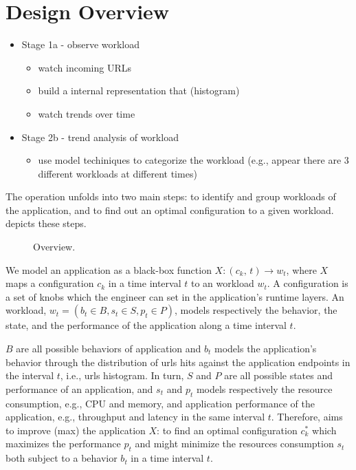 \section{Design Overview}



 \begin{itemize}
   \item Stage 1a - observe workload
     \begin{itemize}
       \item watch incoming URLs
       \item build a internal representation that (histogram)
       \item watch trends over time
     \end{itemize}
   \item Stage 2b - trend analysis of workload
     \begin{itemize}
       \item use model techiniques to categorize the workload (e.g., appear there are 3 different workloads at different
         times)
     \end{itemize}
 \end{itemize}



The \name operation unfolds into two main steps: to identify and group workloads of the application, and to find out an
optimal configuration to a given workload.  depicts these steps.

\begin{figure*}[htp]
    \centering
    \def\svgwidth{\textwidth}
    \scalebox{1.0}{}
    \caption{\name Overview.}
    \label{fig:design-overview}
\end{figure*}

We model an application as a black-box function $X: (c_k,\, t) \rightarrow w_t$, where $X$ maps a configuration $c_k$
in a time interval $t$ to an workload $w_t$.  A configuration is a set of knobs which the engineer can set in the
application's runtime layers. An workload, $w_{t} = (b_t \in B, s_t \in S, p_t \in P)$, models respectively the
behavior, the state, and the performance of the application along a time interval $t$.

$B$ are all possible behaviors of application and $b_t$ models the application's behavior through the distribution of
urls hits against the application endpoints in the interval $t$, i.e., urls histogram. In turn, $S$ and $P$ are all
possible states and performance of an application, and $s_t$ and $p_t$ models respectively the resource consumption,
e.g., CPU and memory, and application performance of the application, e.g., throughput and latency in the same interval
$t$. Therefore, \name aims to improve (max) the application $X$: to find an optimal configuration $c^{*}_{k}$ which
maximizes the performance $p_t$ and might minimize the resources consumption $s_t$ both subject to a behavior $b_t$ in
a time interval $t$. 

